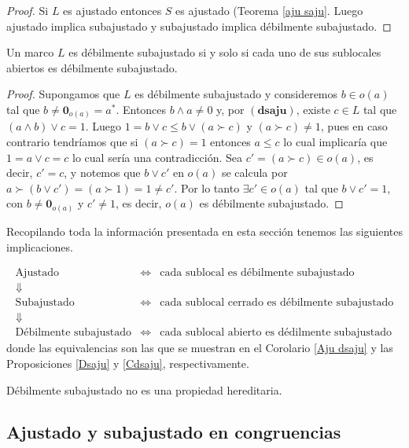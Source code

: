 \documentclass{comunicaciones}
\begin{document}
\begin{proof}
    Si $L$ es ajustado entonces $S$ es ajustado (Teorema \ref{aju saju}. Luego ajustado implica subajustado y subajustado implica débilmente subajustado.
\end{proof}

\begin{prop}\label{Cdsaju}
    Un marco $L$ es débilmente subajustado si y solo si  cada uno de sus sublocales abiertos es débilmente subajustado.
\end{prop}

\begin{proof}
    Supongamos que $L$ es débilmente subajustado y consideremos $b\in o(a)$ tal que $b\neq \mathbf{0}_{o(a)}=a^*$. Entonces $b\wedge a\neq 0$ y, por $(\mathbf{dsaju})$, existe $c\in L$ tal que $(a\wedge b)\vee c=1$. Luego $1=b\vee c\leq b\vee (a\succ c)$ y $(a\succ c)\neq 1$, pues en caso contrario tendríamos que si $(a\succ c)=1$ entonces $a\leq c$ lo cual implicaría que $1=a\vee c=c$ lo cual sería una contradicción. Sea $c'=(a\succ c)\in o(a)$, es decir, $c'=c$, y notemos que $b\vee c'$ en $o(a)$ se calcula por $a\succ (b\vee c')=(a\succ 1)=1\neq c'$. Por lo tanto $\exists c'\in o(a)$ tal que $b\vee c'=1$, con $b\neq \mathbf{0}_{o(a)}$ y $c'\neq 1$, es decir, $o(a)$ es débilmente subajustado.
\end{proof}

Recopilando toda la información presentada en esta sección tenemos las siguientes implicaciones.

\[
\begin{array}{ccl}
   \mbox{Ajustado}  & \Longleftrightarrow & \mbox{cada sublocal es débilmente subajustado}  \\
    \Downarrow &  & \\
   \mbox{Subajustado}  & \Longleftrightarrow & \mbox{cada sublocal cerrado es débilmente subajustado}  \\
    \Downarrow &  & \\
   \mbox{Débilmente subajustado}  & \Longleftrightarrow & \mbox{cada sublocal abierto es dédilmente subajustado}  
\end{array}
\]
donde las equivalencias son las que se muestran en el Corolario \ref{Aju dsaju} y las Proposiciones \ref{Dsaju} y \ref{Cdsaju}, respectivamente.

\begin{cor}
    Débilmente subajustado no es una propiedad hereditaria.
\end{cor}


\subsection{Ajustado y subajustado en congruencias}
\end{document}
